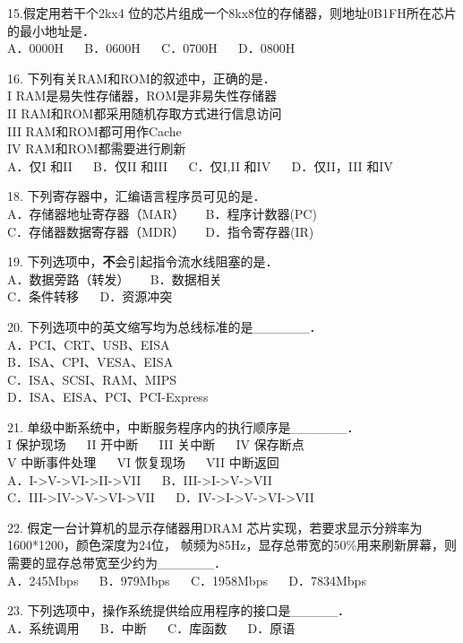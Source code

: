 15.假定用若干个2kx4 位的芯片组成一个8kx8位的存储器，则地址0B1FH所在芯片的最小地址是． \\
A．0000H $\quad$ B．0600H $\quad$ C．0700H $\quad$ D．0800H

16. 下列有关RAM和ROM的叙述中，正确的是． \\
I RAM是易失性存储器，ROM是非易失性存储器 \\
II RAM和ROM都采用随机存取方式进行信息访问 \\
III RAM和ROM都可用作Cache \\
IV RAM和ROM都需要进行刷新 \\
A．仅I 和II $\quad$ B．仅II 和III $\quad$ C．仅I,II 和IV $\quad$ D．仅II，III 和IV

18. 下列寄存器中，汇编语言程序员可见的是． \\
A．存储器地址寄存器（MAR） $\quad$ B．程序计数器(PC) \\
C．存储器数据寄存器（MDR） $\quad$ D．指令寄存器(IR)

19. 下列选项中，\textbf{不}会引起指令流水线阻塞的是． \\
A．数据旁路（转发） $\quad$ B．数据相关 \\
C．条件转移 $\quad$ D．资源冲突

20. 下列选项中的英文缩写均为总线标准的是______． \\
A．PCI、CRT、USB、EISA \\
B．ISA、CPI、VESA、EISA \\
C．ISA、SCSI、RAM、MIPS \\
D．ISA、EISA、PCI、PCI-Express

21. 单级中断系统中，中断服务程序内的执行顺序是______． \\
I 保护现场 $\quad$ II 开中断 $\quad$ III 关中断 $\quad$ IV 保存断点 \\
V 中断事件处理 $\quad$ VI 恢复现场 $\quad$ VII 中断返回 \\
A．I->V->VI->II->VII $\quad$ B．III->I->V->VII \\
C．III->IV->V->VI->VII $\quad$ D．IV->I->V->VI->VII

22. 假定一台计算机的显示存储器用DRAM 芯片实现，若要求显示分辨率为1600*1200，颜色深度为24位，
帧频为85Hz，显存总带宽的50\%用来刷新屏幕，则需要的显存总带宽至少约为______． \\
A．245Mbps $\quad$ B．979Mbps $\quad$ C．1958Mbps $\quad$ D．7834Mbps

23. 下列选项中，操作系统提供给应用程序的接口是_____． \\
A．系统调用 $\quad$ B．中断 $\quad$ C．库函数 $\quad$ D．原语

